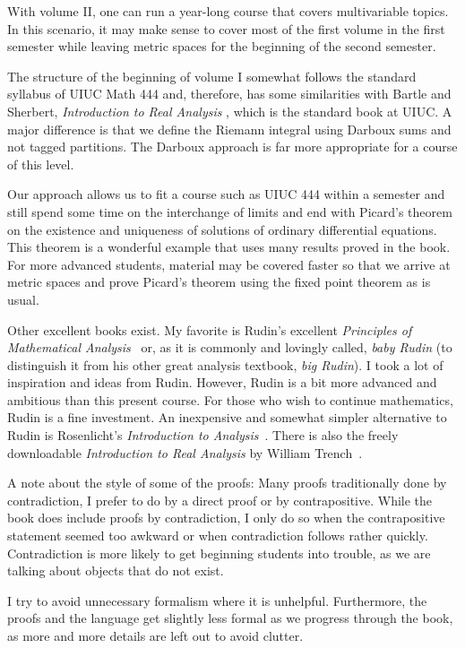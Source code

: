 With volume II, one can run a year-long course that covers multivariable
topics.  In this scenario, it may make sense to cover most of the first volume
in the first semester while leaving metric spaces for the beginning of the
second semester.

The structure of the beginning of volume I somewhat follows the
standard syllabus of UIUC Math 444 and, therefore, has some similarities with
Bartle and Sherbert,
\emph{Introduction to Real Analysis} \cite{BS}, which is the standard book
at UIUC.
A major difference is that we define the Riemann integral using
Darboux sums and not tagged partitions.  The Darboux approach is far more
appropriate for a course of this level.

Our approach allows us to fit a course such as UIUC 444 within a semester
and still spend some time on the interchange of limits and end with
Picard's theorem on the existence and uniqueness of solutions of ordinary
differential equations.
This theorem is a wonderful example
that uses many results proved in the book.  For more advanced students,
material may be covered faster so that we arrive at metric spaces and
prove Picard's theorem using the fixed point theorem as is usual.

Other excellent books exist.  My favorite is 
Rudin's excellent
\emph{Principles of Mathematical Analysis}~\cite{Rudin:baby}
or, as it is commonly and lovingly called, \emph{baby Rudin}
(to distinguish it from his other great analysis textbook,
\emph{big Rudin}).  I took a
lot of inspiration and ideas from Rudin.  However, Rudin is a bit more
advanced and ambitious than this present course.
For those who wish to continue
mathematics, Rudin is a fine investment.
An inexpensive and somewhat simpler alternative to Rudin is
Rosenlicht's \emph{Introduction to Analysis}~\cite{Rosenlicht}.
There is also the freely downloadable \emph{Introduction to Real
Analysis} by William Trench~\cite{Trench}.

\medskip

A note about the style of some of the proofs:  Many proofs
traditionally done by contradiction, I prefer to do by
a direct proof or by contrapositive.  While the book does include
proofs by contradiction, I only
do so when the contrapositive statement seemed too awkward or when 
contradiction follows rather quickly.
Contradiction is more likely to get beginning students into trouble,
as we are talking about objects that do not exist.

I try to avoid unnecessary formalism where it is unhelpful.
Furthermore, the proofs and the language get slightly less formal as we
progress through the book, as more and more details are left out to avoid
clutter.

